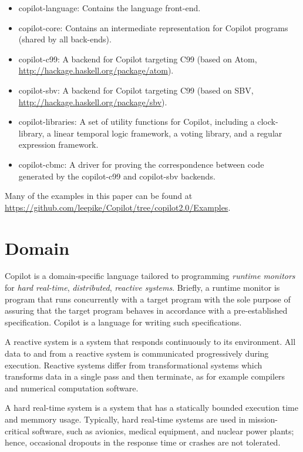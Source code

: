\documentclass[]{article}
\theoremstyle{example}
\begin{document}
\begin{itemize}
\item copilot-language: Contains the language front-end.
\item copilot-core: Contains an intermediate representation for Copilot programs (shared by all back-ends).
\item copilot-c99: A backend for Copilot targeting C99 (based on Atom, \url{http://hackage.haskell.org/package/atom}).
\item copilot-sbv: A backend for Copilot targeting C99 (based on SBV, \url{http://hackage.haskell.org/package/sbv}).
\item copilot-libraries: A set of utility functions for Copilot, including a clock-library, a linear temporal logic framework,
a voting library, and a regular expression framework.
\item copilot-cbmc: A driver for proving the correspondence between code
  generated by the copilot-c99 and copilot-sbv backends.
\end{itemize}

Many of the examples in this paper can be found at \url{https://github.com/leepike/Copilot/tree/copilot2.0/Examples}.
\section{Domain}

Copilot is a domain-specific language tailored to programming \emph{runtime
monitors} for \emph{hard real-time}, \emph{distributed}, \emph{reactive systems}.
Briefly, a runtime monitor is program that runs concurrently with a target program
with the sole purpose of assuring that the target program behaves in accordance with a
pre-established specification. Copilot is a language for writing such specifications.

A reactive system is a system that responds continuously to its environment.
All data to and from a reactive system is communicated progressively during
execution. Reactive systems differ from transformational systems which transforms
data in a single pass and then terminate, as for example compilers and numerical
computation software.

A hard real-time system is a system that has a statically bounded execution time
and memmory usage.  Typically, hard real-time systems are used in
mission-critical software, such as avionics, medical equipment, and nuclear power
plants; hence, occasional dropouts in the response time or crashes are not
tolerated.
\end{document}
